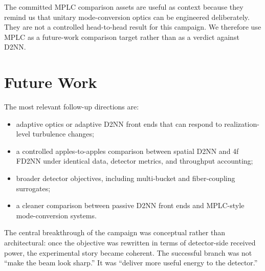 The committed MPLC comparison assets are useful as context because they remind
us that unitary mode-conversion optics can be engineered deliberately. They are
not a controlled head-to-head result for this campaign. We therefore use MPLC as
a future-work comparison target rather than as a verdict against D2NN.

\section{Future Work}

The most relevant follow-up directions are:
\begin{itemize}
  \item adaptive optics or adaptive D2NN front ends that can respond to
  realization-level turbulence changes;
  \item a controlled apples-to-apples comparison between spatial D2NN and 4f
  FD2NN under identical data, detector metrics, and throughput accounting;
  \item broader detector objectives, including multi-bucket and fiber-coupling
  surrogates;
  \item a cleaner comparison between passive D2NN front ends and MPLC-style
  mode-conversion systems.
\end{itemize}

\begin{breakthrough}
The central breakthrough of the campaign was conceptual rather than architectural:
once the objective was rewritten in terms of detector-side received power, the
experimental story became coherent. The successful branch was not ``make the
beam look sharp.'' It was ``deliver more useful energy to the detector.''
\end{breakthrough}
